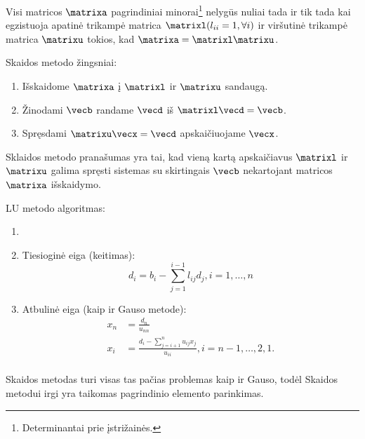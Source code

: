 \cite[76-78]{textbook}


\begin{prop}
  Visi matricos $\matrixa$ pagrindiniai minorai\footnote{Determinantai
  prie įstrižainės.} nelygūs nuliai tada ir tik tada kai egzistuoja
  apatinė trikampė matrica
  $\matrixl (l_{ii}=1, \forall i)$ ir viršutinė trikampė matrica
  $\matrixu$ tokios, kad $\matrixa = \matrixl \matrixu$.
\end{prop}


Skaidos metodo žingsniai:
\begin{enumerate}
  \item Išskaidome $\matrixa$ į $\matrixl$ ir $\matrixu$ sandaugą.
  \item Žinodami $\vecb$ randame $\vecd$ iš $\matrixl\vecd = \vecb$.
  \item Spręsdami $\matrixu\vecx = \vecd$ apskaičiuojame $\vecx$.
\end{enumerate}
Sklaidos metodo pranašumas yra tai, kad vieną kartą apskaičiavus $\matrixl$ ir
$\matrixu$ galima spręsti sistemas su skirtingais $\vecb$ nekartojant
matricos $\matrixa$ išskaidymo.


LU metodo algoritmas:
\begin{enumerate}
  \item {}
  \item Tiesioginė eiga (keitimas):
    \begin{equation*}
      d_{i} = b_{i} - \sum_{j=1}^{i-1}l_{ij}d_{j}, i=1,\ldots,n
    \end{equation*}
  \item Atbulinė eiga (kaip ir Gauso metode):
    \begin{align*}
      x_{n} &= \frac{d_{n}}{u_{nn}} \\
      x_{i} &= \frac{d_{i} - \sum_{j=i+1}^{n}u_{ij}x_{j}}{u_{ii}},
        i=n-1,\ldots,2,1. \\
    \end{align*}
\end{enumerate}


Skaidos metodas turi visas tas pačias problemas kaip ir Gauso, todėl
Skaidos metodui irgi yra taikomas pagrindinio elemento parinkimas.

